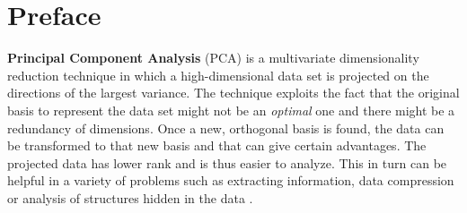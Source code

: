 \documentclass[10pt,twocolumn]{article}
\begin{document}



\vspace{10mm}

\setlength{\parindent}{0cm}

\fontsize{14}{10}\selectfont {Kamila Zdybał}

\vspace{2mm}

\fontsize{8}{10}

\fontsize{8}{10}

\section*{Preface}

\textbf{Principal Component Analysis} (PCA) is a multivariate dimensionality reduction technique in which a high-dimensional data set is projected on the directions of the largest variance. The technique exploits the fact that the original basis to represent the data set might not be an \textit{optimal} one and there might be a redundancy of dimensions. Once a new, orthogonal basis is found, the data can be transformed to that new basis and that can give certain advantages. The projected data has lower rank and is thus easier to analyze. This in turn can be helpful in a variety of problems such as extracting information, data compression or analysis of structures hidden in the data \cite{Abdi_Williams}.
\end{document}
